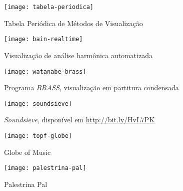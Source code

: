 \documentclass{sciposter}
\begin{document}
\begin{multicols}{2}

\begin{figure}
  \centering
  \texttt{[image: tabela-periodica]}
  \caption{Tabela Periódica de Métodos de Visualização \cite{Lengler2007}}
  \label{fig:tabela-periodica}
\end{figure}

\begin{figure}
  \centering
  \texttt{[image: bain-realtime]}
  \caption{Visualização de análise harmônica automatizada \cite{Bain2008}}
  \label{fig:bain-realtime}
\end{figure}

\begin{figure}
  \centering
  \texttt{[image: watanabe-brass]}
  \caption{Programa \textit{BRASS}, visualização em partitura condensada \cite{Watanabe2003}}
  \label{fig:watanabe-brass}
\end{figure}


\begin{figure}
  \centering
  \texttt{[image: soundsieve]}
  \caption{\textit{Soundsieve}, disponível em \url{http://bit.ly/HvL7PK}}
  \label{fig:soundsieve}
\end{figure}

\begin{figure}
  \centering
  \texttt{[image: topf-globe]}
  \caption{Globe of Music \cite{Leitich2007}}
  \label{fig:topf-globe}
\end{figure}


\begin{figure}
  \centering
  \texttt{[image: palestrina-pal]}
  \caption{Palestrina Pal \cite{Gramit2005}}
  \label{fig:palestrina-pal}
\end{figure}

\end{multicols}
\end{document}
